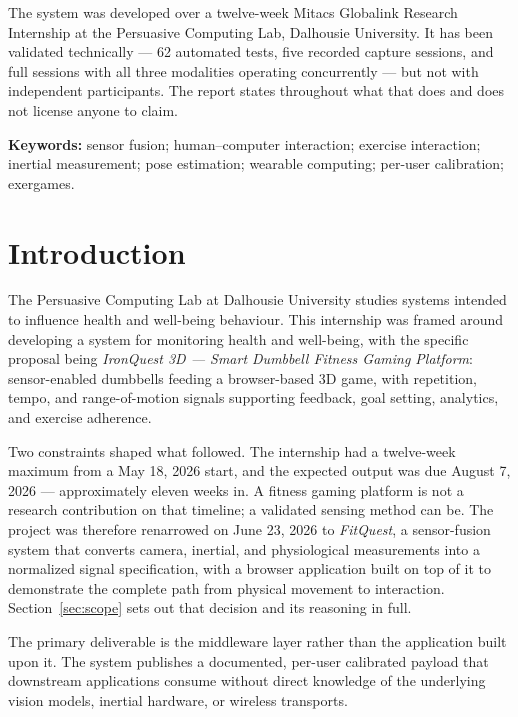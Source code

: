 \documentclass[11pt,a4paper]{article}
\begin{document}
The system was developed over a twelve-week Mitacs Globalink Research
Internship at the Persuasive Computing Lab, Dalhousie University. It has been
validated technically --- 62 automated tests, five recorded capture sessions,
and full sessions with all three modalities operating concurrently --- but not
with independent participants. The report states throughout what that does and
does not license anyone to claim.

\vspace{0.4cm}
\noindent\textbf{Keywords:} sensor fusion; human--computer interaction;
exercise interaction; inertial measurement; pose estimation; wearable
computing; per-user calibration; exergames.

\newpage

\section{Introduction}

The Persuasive Computing Lab at Dalhousie University studies systems intended to
influence health and well-being behaviour. This internship was framed around
developing a system for monitoring health and well-being, with the specific
proposal being \emph{IronQuest 3D --- Smart Dumbbell Fitness Gaming Platform}:
sensor-enabled dumbbells feeding a browser-based 3D game, with repetition,
tempo, and range-of-motion signals supporting feedback, goal setting, analytics,
and exercise adherence.

Two constraints shaped what followed. The internship had a twelve-week maximum
from a May 18, 2026 start, and the expected output was due August 7, 2026 ---
approximately eleven weeks in. A fitness gaming platform is not a research
contribution on that timeline; a validated sensing method can be. The project
was therefore renarrowed on June 23, 2026 to \emph{FitQuest}, a sensor-fusion
system that converts camera, inertial, and physiological measurements into a
normalized signal specification, with a browser application built on top of it
to demonstrate the complete path from physical movement to interaction.
Section~\ref{sec:scope} sets out that decision and its reasoning in full.

The primary deliverable is the middleware layer rather than the application
built upon it. The system publishes a documented, per-user calibrated payload
that downstream applications consume without direct knowledge of the underlying
vision models, inertial hardware, or wireless transports.
\end{document}
